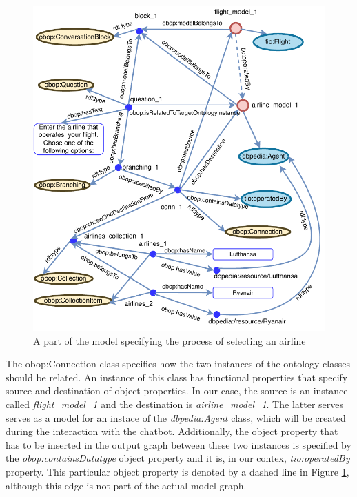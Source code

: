 \documentclass[runningheads]{llncs}
\begin{document}
\begin{figure}[H]
  \centering
  \includegraphics[width=\linewidth]{img/branching_schema}
  \caption{A part of the model specifying the process of selecting an airline}
  \label{fig:branching_schema}
\end{figure}

The obop:Connection class specifies how the two instances of the ontology classes should be related. An instance of this class has functional properties that specify source and destination of object properties. In our case, the source is an instance called \textit{flight\_model\_1} and the destination is \textit{airline\_model\_1}. The latter serves serves as a model for an instace of the  \textit{dbpedia:Agent} class, which will be created during the interaction with the chatbot. Additionally, the object property that has to be inserted in the output graph between these two instances is specified by the \textit{obop:containsDatatype} object property and it is, in our contex, \textit{tio:operatedBy} property. This particular object property is denoted by a dashed line in Figure \ref{fig:branching_schema}, although this edge is not part of the actual model graph.    
\end{document}
